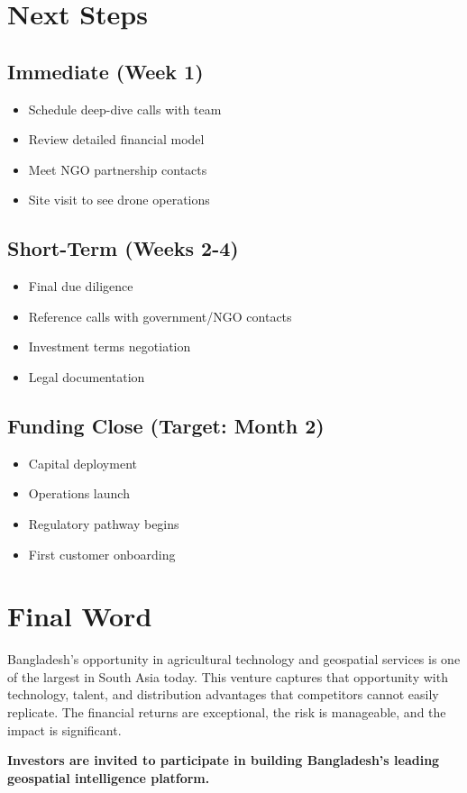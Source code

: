 \section{Next Steps}

\subsection{Immediate (Week 1)}

\begin{itemize}
    \item Schedule deep-dive calls with team
    \item Review detailed financial model
    \item Meet NGO partnership contacts
    \item Site visit to see drone operations
\end{itemize}

\subsection{Short-Term (Weeks 2-4)}

\begin{itemize}
    \item Final due diligence
    \item Reference calls with government/NGO contacts
    \item Investment terms negotiation
    \item Legal documentation
\end{itemize}

\subsection{Funding Close (Target: Month 2)}

\begin{itemize}
    \item Capital deployment
    \item Operations launch
    \item Regulatory pathway begins
    \item First customer onboarding
\end{itemize}

\section{Final Word}

Bangladesh's opportunity in agricultural technology and geospatial services is one of the largest in South Asia today. This venture captures that opportunity with technology, talent, and distribution advantages that competitors cannot easily replicate. The financial returns are exceptional, the risk is manageable, and the impact is significant.

\textcolor{SecondaryBlue}{\textbf{Investors are invited to participate in building Bangladesh's leading geospatial intelligence platform.}}

